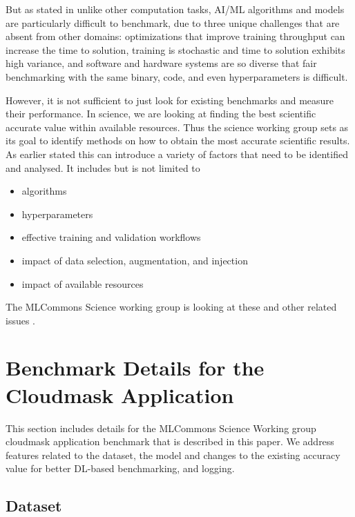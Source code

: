 \documentclass[sigplan,screen]{acmart}
\begin{document}
But as stated in \cite{arxiv-mlperf} unlike other computation tasks, AI/ML algorithms and models are particularly difficult to benchmark, due to three unique challenges that are absent from other domains: optimizations that improve training throughput can increase the time to solution, training is stochastic and time to solution exhibits high variance, and software and hardware systems are so diverse that fair benchmarking with the same binary, code, and even hyperparameters is difficult. 

However, it is not sufficient to just look for existing benchmarks and measure their performance. In science, we are looking at finding the best scientific accurate value within available resources. 
Thus the science working group sets as its goal to identify methods on how to obtain the most accurate scientific results.
As earlier stated this can introduce a variety of factors that need to be identified and analysed. It includes but is not limited to 

\begin{itemize}
    \item algorithms
    \item hyperparameters
    \item effective training and validation workflows
    \item impact of data selection, augmentation, and injection
    \item impact of available resources
\end{itemize}

The MLCommons Science working group is looking at these and other related issues
\cite{mlcommons-benchmark-2023}.



\section{Benchmark Details for the Cloudmask Application}
\label{sec:bench-method}

This section includes details for the MLCommons Science Working group cloudmask application benchmark that is described in this paper. We address features related to the dataset, the model and changes to the existing accuracy value for better DL-based benchmarking, and logging. 

\subsection{Dataset}
\end{document}
